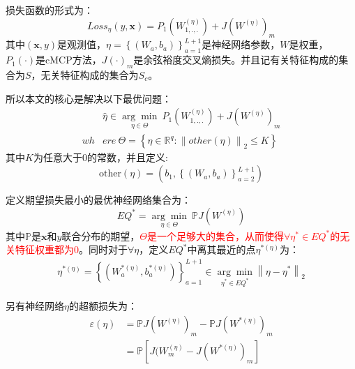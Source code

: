 \documentclass{article}
\begin{document}
损失函数的形式为：
\begin{equation}\label{loss}
	Loss_{\eta}(y,\pmb{x})=P_1(W_{1,.,.}^{(\eta)})+J(W^{(\eta)})_{m}
\end{equation}
\qquad 其中$(\pmb{x},y)$是观测值，$\eta=\left\{(W_a,b_a)\right\}^{L+1}_{a=1}$是神经网络参数，$W$是权重，$P_1(\cdot)$是cMCP方法，$J(\cdot)_m$是余弦裕度交叉熵损失。并且记有关特征构成的集合为$S$，无关特征构成的集合为$S_c$。
\par 所以本文的核心是解决以下最优问题：
\begin{equation}\label{hateta}
	\begin{aligned}
	    &\hat{\eta}\in\underset{\eta \in \Theta}{\arg \min}\ P_1(W_{1,.,.}^{(\eta)})+J(W^{(\eta)})_{m}\\
	     wh&ere\ \Theta=\left\{\eta\in\mathbb{R}^q:\left\|other(\eta)\right\|_2\leq K\right \}
	\end{aligned}
\end{equation}
其中$K$为任意大于$0$的常数，并且定义:
\begin{equation}\label{other}
	\text{other}(\eta)=(b_1,\left\{(W_a,b_a)\right\}_{a=2}^{L+1})
\end{equation}
\par 定义期望损失最小的最优神经网络集合为：
\begin{equation}\label{EQ}
	EQ^*=\underset{\eta \in \Theta}{\arg \min}\ \mathbb{P}J(W^{(\eta)})
\end{equation}
其中$\mathbb{P}$是$\pmb{x}$和$y$联合分布的期望，\textcolor{red}{$\Theta$是一个足够大的集合，从而使得$\forall \eta^* \in EQ^*$的无关特征权重都为$0$}。同时对于$\forall\eta$，定义$EQ^*$中离其最近的点$\eta^{*(\eta)}$为：
\begin{equation}\label{definationofstar}
	\begin{split}
		\eta^{*(\eta)}=\left\{(W_a^{*(\eta)},b_a^{*(\eta)})\right\}_{a=1}^{L+1}\in \underset{\eta^*\in EQ^*}{\arg \min}\left\|\eta-\eta^*\right\|_2
	\end{split}
\end{equation}
\par 另有神经网络$\eta$的超额损失为：
\begin{equation}\label{excessloss}
\begin{aligned}
	\varepsilon(\eta)&=\mathbb{P}J(W^{(\eta)})_m-\mathbb{P}J(W^{*(\eta)})_m\\
	&=\mathbb{P}\left[J(W^{(\eta)}_m-J(W^{*(\eta)})_m\right]
\end{aligned}
\end{equation}
\end{document}
